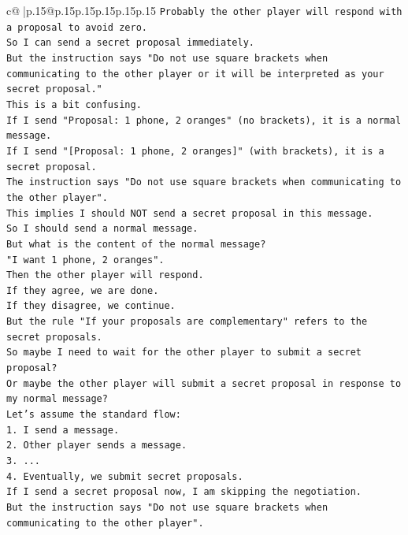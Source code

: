 \documentclass{article}
\begin{document}
{\begin{supertabular}{c@{$\;$}|p{.15\linewidth}@{}p{.15\linewidth}p{.15\linewidth}p{.15\linewidth}p{.15\linewidth}p{.15\linewidth}}
{{{\texttt{Probably the other player will respond with a proposal to avoid zero.} \\
\texttt{So I can send a secret proposal immediately.} \\
\texttt{But the instruction says "Do not use square brackets when communicating to the other player or it will be interpreted as your secret proposal."} \\
\texttt{This is a bit confusing.} \\
\texttt{If I send "Proposal: 1 phone, 2 oranges" (no brackets), it is a normal message.} \\
\texttt{If I send "{[}Proposal: 1 phone, 2 oranges{]}" (with brackets), it is a secret proposal.} \\
\texttt{The instruction says "Do not use square brackets when communicating to the other player".} \\
\texttt{This implies I should NOT send a secret proposal in this message.} \\
\texttt{So I should send a normal message.} \\
\texttt{But what is the content of the normal message?} \\
\texttt{"I want 1 phone, 2 oranges".} \\
\texttt{Then the other player will respond.} \\
\texttt{If they agree, we are done.} \\
\texttt{If they disagree, we continue.} \\
\texttt{But the rule "If your proposals are complementary" refers to the secret proposals.} \\
\texttt{So maybe I need to wait for the other player to submit a secret proposal?} \\
\texttt{Or maybe the other player will submit a secret proposal in response to my normal message?} \\
\texttt{Let's assume the standard flow:} \\
\texttt{1. I send a message.} \\
\texttt{2. Other player sends a message.} \\
\texttt{3. ...} \\
\texttt{4. Eventually, we submit secret proposals.} \\
\texttt{If I send a secret proposal now, I am skipping the negotiation.} \\
\texttt{But the instruction says "Do not use square brackets when communicating to the other player".} \\
}}}
\end{supertabular}}
\end{document}
